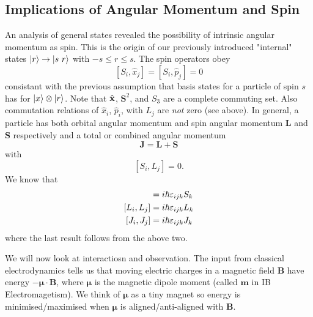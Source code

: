 \documentclass{article}
\begin{document}
\subsection{Implications of Angular Momentum and Spin}
An analysis of general states revealed the possibility of intrinsic angular momentum as spin. This is the origin of our previously introduced "internal" states $ \ket r \to \ket{s\ r} $ with $ -s\le r \le s $. The spin operators obey 
\[
	[S_i, \hat x_j] = [S_i, \hat p_j] = 0
\]
consistant with the previous assumption that basis states for a particle of spin $ s $ has for $ \ket x \otimes \ket r $. Note that $ \hat {\mathbf{x}} $, $ \mathbf S^2 $, and $ S_3 $ are a complete commuting set. Also commutation relations of $ \hat x_i $, $ \hat p_i $, with $ L_j $ are \textit{not} zero (see above). In general, a particle has both orbital angular momentum and spin angular momentum $ \mathbf L $ and $ \mathbf S $ respectively and a total or combined angular momentum
\[
  \mathbf J  = \mathbf L + \mathbf S
\]
with
\[
	[S_i,L_j ] =0.
\]
We know that 
\begin{align*}
	[S_i,S_j] &= i\hbar \ep_{ijk} S_k\\
	[L_i,L_j] &= i\hbar \ep_{ijk} L_k \\
	[J_i, J_j] &= i\hbar \ep_{ijk} J_k
\end{align*}
where the last result follows from the above two.\par
We will now look at interactiosn and observation. The input from classical electrodynamics tells us that moving electric charges in a magnetic field $ \mathbf B $ have energy $ -\boldsymbol \mu \cdot\mathbf B $, where $ \boldsymbol\mu $ is the magnetic dipole moment (called $ \mathbf m $ in IB Electromagetism). We think of $ \boldsymbol \mu $ as a tiny magnet so energy is minimised/maximised when $ \boldsymbol \mu $ is aligned/anti-aligned with $ \mathbf B $.
\end{document}
